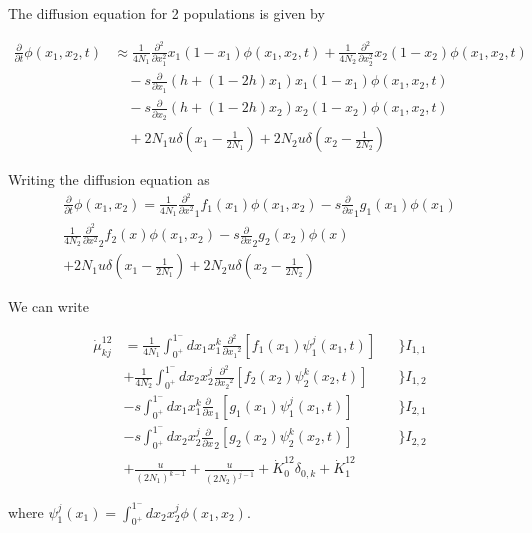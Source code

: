 \documentclass[a4paper, 12pt]{article}
\newcommand{\del}[1]{\ensuremath{\frac{\partial}{\partial #1}}}
\newcommand{\dell}[1]{\ensuremath{\frac{\partial^2}{\partial {#1}^2}}}
\begin{document}
The diffusion equation for 2 populations is given by 

\begin{align}
\label{eq:difeq_2p}
\frac{\partial}{\partial t} \phi(x_1, x_2, t) & \approx 
\frac{1}{4N_1}\frac{\partial^2}{\partial x_1^2} 
x_1 (1 - x_1) \phi(x_1, x_2,t) 
+ \frac{1}{4N_2}\frac{\partial^2}{\partial x_2^2} 
x_2 (1 - x_2) \phi(x_1, x_2,t) \\ \nonumber
& \quad -s\frac{\partial}{\partial x_1} 
(h + (1 - 2 h)x_1)
x_1 (1 - x_1) \phi(x_1,x_2,t) \\ \nonumber
& \quad -s\frac{\partial}{\partial x_2} 
(h + (1 - 2 h)x_2)
x_2 (1 - x_2) \phi(x_1,x_2,t) \\ \nonumber
& \quad + 2 N_1 u \delta(x_1 - \frac{1}{2N_1})
+ 2 N_2 u \delta(x_2 - \frac{1}{2N_2})
\end{align}

Writing the diffusion equation as 
\begin{align}
  \del t \phi (x_1,x_2) =  
  \frac{1}{4N_1} \dell x_1 f_1(x_1)\phi(x_1, x_2) - s \del x_1 g_1(x_1)\phi(x_1) 
  \nonumber \\
  \frac{1}{4N_2} \dell x_2 f_2(x)\phi(x_1, x_2) - s \del x_2 g_2(x_2)\phi(x) 
  \nonumber \\
  + 2N_1u\delta(x_1  - \frac{1}{2N_1})
  + 2N_2u\delta(x_2  - \frac{1}{2N_2})
\end{align}

We can write 

\begin{align}
  \dot \mu_{kj}^{12}
  &= \frac{1}{4N_1}\int_{0^+}^{1^-}dx_1 x_1^k \dell {x_1} [f_1(x_1)\psi_1^j(x_1,t)] 
  & & \bigg\} I_{1,1}
  \nonumber \\
  \quad&+ \frac{1}{4N_2}\int_{0^+}^{1^-}dx_2 x_2^j \dell {x_2} [f_2(x_2)\psi_2^k(x_2,t)] 
  & & \bigg\} I_{1,2}
  \nonumber \\
  \quad &- s\int_{0^+}^{1^-}dx_1 x_1^k \del x_1 [g_1(x_1)\psi_1^j(x_1,t)] 
  & & \bigg\} I_{2,1}
  \nonumber \\
  \quad &- s\int_{0^+}^{1^-}dx_2 x_2^j \del x_2 [g_2(x_2)\psi_2^k(x_2,t)] 
  & & \bigg\} I_{2,2}
  \nonumber \\
  \quad &+\frac{u}{(2N_1)^{k -1}} +\frac{u}{(2N_2)^{j -1}}
  + \dot K_0^{12} \delta_{0,k} + \dot K_1^{12} 
  \label{eq:dmk3}
\end{align}

where $\psi_1^j(x_1) = \int_{0^+}^{1^-}dx_2 x_2^j \phi(x_1,x_2)$.
\end{document}
